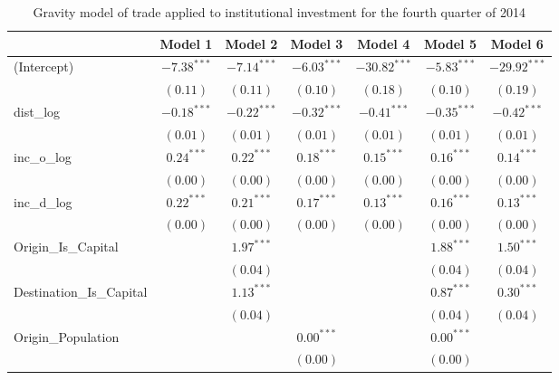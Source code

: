 \begin{table}
	\small
	\begin{center}
		\caption[CGravity Model of Trade for Q4 2014]{Gravity model of trade applied to institutional investment for the fourth quarter of 2014}
		\begin{tabular}{l c c c c c c }
			\hline
			& Model 1 & Model 2 & Model 3 & Model 4 & Model 5 & Model 6 \\
			\hline
			(Intercept)                  & $-7.38^{***}$ & $-7.14^{***}$ & $-6.03^{***}$ & $-30.82^{***}$ & $-5.83^{***}$ & $-29.92^{***}$ \\
			& $(0.11)$      & $(0.11)$      & $(0.10)$      & $(0.18)$       & $(0.10)$      & $(0.19)$       \\
			dist\_log                    & $-0.18^{***}$ & $-0.22^{***}$ & $-0.32^{***}$ & $-0.41^{***}$  & $-0.35^{***}$ & $-0.42^{***}$  \\
			& $(0.01)$      & $(0.01)$      & $(0.01)$      & $(0.01)$       & $(0.01)$      & $(0.01)$       \\
			inc\_o\_log                  & $0.24^{***}$  & $0.22^{***}$  & $0.18^{***}$  & $0.15^{***}$   & $0.16^{***}$  & $0.14^{***}$   \\
			& $(0.00)$      & $(0.00)$      & $(0.00)$      & $(0.00)$       & $(0.00)$      & $(0.00)$       \\
			inc\_d\_log                  & $0.22^{***}$  & $0.21^{***}$  & $0.17^{***}$  & $0.13^{***}$   & $0.16^{***}$  & $0.13^{***}$   \\
			& $(0.00)$      & $(0.00)$      & $(0.00)$      & $(0.00)$       & $(0.00)$      & $(0.00)$       \\
			Origin\_Is\_Capital          &               & $1.97^{***}$  &               &                & $1.88^{***}$  & $1.50^{***}$   \\
			&               & $(0.04)$      &               &                & $(0.04)$      & $(0.04)$       \\
			Destination\_Is\_Capital     &               & $1.13^{***}$  &               &                & $0.87^{***}$  & $0.30^{***}$   \\
			&               & $(0.04)$      &               &                & $(0.04)$      & $(0.04)$       \\
			Origin\_Population           &               &               & $0.00^{***}$  &                & $0.00^{***}$  &                \\
			&               &               & $(0.00)$      &                & $(0.00)$      &                \\

\end{tabular}
\end{center}
\end{table}
